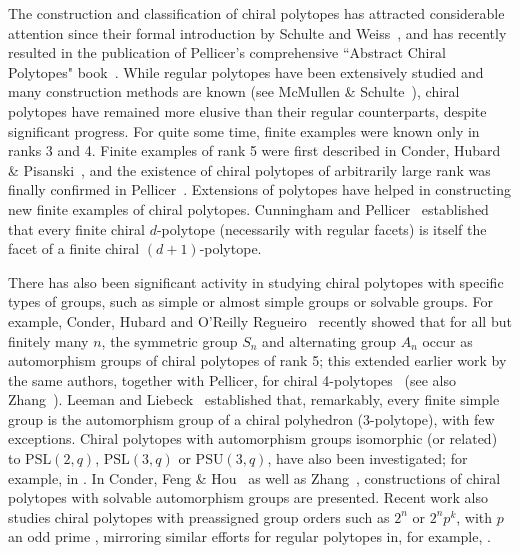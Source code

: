 \documentclass[12pt]{article}
\theoremstyle{definition}\newtheorem{definition}{Definition}[section]
\begin{document}
The construction and classification of chiral polytopes has attracted considerable attention since their formal introduction by Schulte and Weiss~\cite{SchWei1991,SchWei1994}, and has recently resulted in the publication of Pellicer's comprehensive ``Abstract Chiral Polytopes" book~\cite{Pel2025}. While regular polytopes have been extensively studied and many construction methods are known (see McMullen \& Schulte~\cite{McMSch2002}), chiral polytopes have remained more elusive than their regular counterparts, despite significant progress. For quite some time, finite examples were known only in ranks 3 and 4. Finite examples of rank 5 were first described in Conder, Hubard \& Pisanski~\cite{CHP2008}, and the existence of chiral polytopes of arbitrarily large rank was finally confirmed in Pellicer~\cite{Pel2010}. Extensions of polytopes have helped in constructing new finite examples of chiral polytopes. Cunningham and Pellicer~\cite{CunPel2014} established that every finite chiral $d$-polytope (necessarily with regular facets) is itself the facet of a finite chiral $(d+1)$-polytope.

There has also been significant activity in studying chiral polytopes with specific types of groups, such as simple or almost simple groups or solvable groups. For example, Conder, Hubard and O'Reilly Regueiro~\cite{CHO2024} recently showed that for all but finitely many $n$, the symmetric group $S_n$ and alternating group $A_n$ occur as automorphism groups of chiral polytopes of rank 5; this extended earlier work by the same authors, together with Pellicer, for chiral 4-polytopes~\cite{CHPO2015} (see also Zhang~\cite{Zha2023a}). Leeman and Liebeck~\cite{LeeLie2017} established that, remarkably, every finite simple group is the automorphism group of a chiral polyhedron (3-polytope), with few exceptions. Chiral polytopes with automorphism groups isomorphic (or related) to $\mathrm{PSL}(2,q)$, $\mathrm{PSL}(3,q)$ or $\mathrm{PSU}(3,q)$, have also been investigated; for example, in \cite{BreCat2021,CPS2008,LMO2017,LeeVand2023}. In Conder, Feng \& Hou~\cite{CFH2021} as well as Zhang~\cite{Zha2023b}, constructions of chiral polytopes with solvable automorphism groups are presented. Recent work also studies chiral polytopes with preassigned group orders such as $2^n$ or $2^np^k$, with $p$ an odd prime \cite{Cun2018,HZG2024}, mirroring similar efforts for regular polytopes in, for example, \cite{HFL2020,HFL2025,SchWei2006}.
\end{document}
